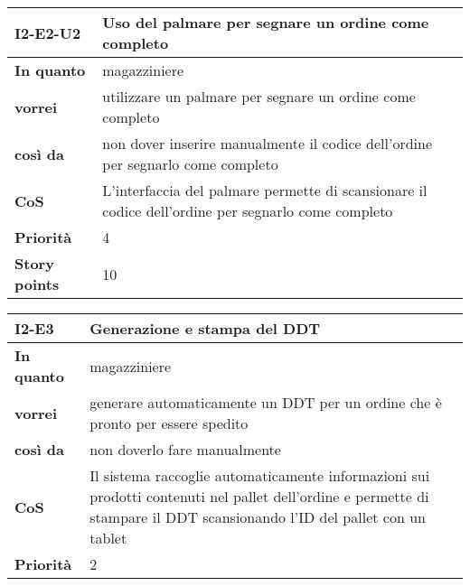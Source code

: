 \begin{table}[H]
  \begin{tabularx}{\textwidth}{lX}
    \toprule
    \textbf{I2-E2-U2} & \textbf{Uso del palmare per segnare un ordine come completo} \\
    \midrule
    \textbf{In quanto} & magazziniere \\
    \textbf{vorrei} & utilizzare un palmare per segnare un ordine come completo \\
    \textbf{così da} & non dover inserire manualmente il codice dell'ordine per segnarlo come completo\\
    \midrule
    \textbf{CoS} & L'interfaccia del palmare permette di scansionare il codice dell'ordine per segnarlo come completo \\
    \midrule
    \textbf{Priorità} & 4 \\
    \textbf{Story points} & 10 \\
    \bottomrule
  \end{tabularx}
  \label{user-story:i2-e2-u2}
\end{table}

\begin{table}[H]
  \begin{tabularx}{\textwidth}{lX}
    \toprule
    \textbf{I2-E3} & \textbf{Generazione e stampa del DDT} \\
    \midrule
    \textbf{In quanto} & magazziniere \\
    \textbf{vorrei} & generare automaticamente un DDT per un ordine che è pronto per essere spedito \\
    \textbf{così da} & non doverlo fare manualmente \\
    \midrule
    \textbf{CoS} & Il sistema raccoglie automaticamente informazioni sui prodotti contenuti nel pallet dell'ordine e permette di stampare il DDT scansionando l'ID del pallet con un tablet \\
    \midrule
    \textbf{Priorità} & 2 \\
    \bottomrule
  \end{tabularx}
  \label{user-story:i2-e3}
\end{table}

